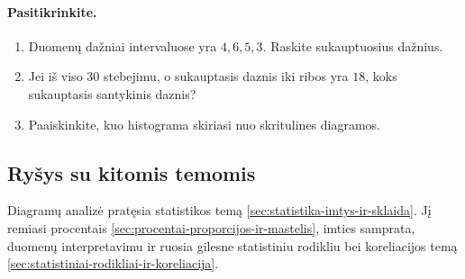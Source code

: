 \paragraph{Pasitikrinkite.}
\begin{enumerate}[label=\alph*)]
\item Duomenų dažniai intervaluose yra $4,6,5,3$. Raskite sukauptuosius dažnius.
\item Jei iš viso $30$ stebejimu, o sukauptasis daznis iki ribos yra $18$, koks sukauptasis santykinis daznis?
\item Paaiskinkite, kuo histograma skiriasi nuo skritulines diagramos.
\end{enumerate}

\subsection{Ryšys su kitomis temomis}
Diagramų analizė pratęsia statistikos temą \ref{sec:statistika-imtys-ir-sklaida}. Jį remiasi procentais \ref{sec:procentai-proporcijos-ir-mastelis}, imties samprata, duomenų interpretavimu ir ruosia gilesne statistiniu rodikliu bei koreliacijos temą \ref{sec:statistiniai-rodikliai-ir-koreliacija}.
